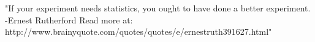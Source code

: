 
"If your experiment needs statistics, you ought to have done a better
experiment. -Ernest Rutherford
Read more at: http://www.brainyquote.com/quotes/quotes/e/ernestruth391627.html"


\label{chapter:5}
